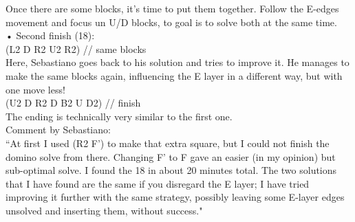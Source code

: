 \documentclass[11pt,a4paper]{book}
\newcommand{\p}{\textquotesingle}
\newcommand{\ps}{\p\,\,}
\newcommand{\comment}[1]{{\color{gray}\quad//#1}}
\begin{document}
Once there are some blocks, it’s time to put them together. Follow the E-edges movement and focus un U/D blocks, to goal is to solve both at the same time.\\
\newline
• Second finish (18):\\
(L2 D R2 U2 R2)  \comment{ same blocks }\\
Here, Sebastiano goes back to his solution and tries to improve it.  He manages to make the same blocks again, influencing the E layer in a different way, but with one move less!\\
\newline
(U2 D R2 D B2 U\ps D2)  \comment{ finish }\\
The ending is technically very similar to the first one.\\
\newline
Comment by Sebastiano:\\
“At first I used (R2 F') to make that extra square, but I could not finish the domino solve from there. Changing F' to F gave an easier (in my opinion) but sub-optimal solve. I found the 18 in about 20 minutes total. The two solutions that I have found are the same if you disregard the E layer; I have tried improving it further with the same strategy, possibly leaving some E-layer edges unsolved and inserting them, without success."\\
\end{document}
